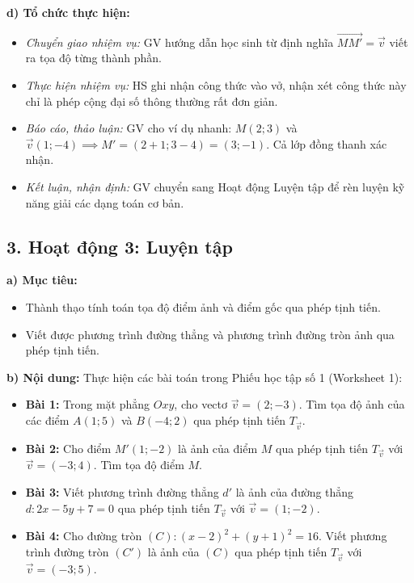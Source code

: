\documentclass[12pt, a4paper]{article}
\renewcommand{\vec}[1]{\overrightarrow{#1}}
\begin{document}
\noindent \textbf{d) Tổ chức thực hiện:}  
\begin{itemize}[leftmargin=0.8cm]  
    \item \textit{Chuyển giao nhiệm vụ:} GV hướng dẫn học sinh từ định nghĩa $\vec{MM'} = \vec{v}$ viết ra tọa độ từng thành phần.  
    \item \textit{Thực hiện nhiệm vụ:} HS ghi nhận công thức vào vở, nhận xét công thức này chỉ là phép cộng đại số thông thường rất đơn giản.  
    \item \textit{Báo cáo, thảo luận:} GV cho ví dụ nhanh: $M(2; 3)$ và $\vec{v}(1; -4) \implies M' = (2+1; 3-4) = (3; -1)$. Cả lớp đồng thanh xác nhận.  
    \item \textit{Kết luận, nhận định:} GV chuyển sang Hoạt động Luyện tập để rèn luyện kỹ năng giải các dạng toán cơ bản.  
\end{itemize}  
  
\subsection*{3. Hoạt động 3: Luyện tập}  
  
\noindent \textbf{a) Mục tiêu:}  
\begin{itemize}[leftmargin=0.8cm]  
    \item Thành thạo tính toán tọa độ điểm ảnh và điểm gốc qua phép tịnh tiến.  
    \item Viết được phương trình đường thẳng và phương trình đường tròn ảnh qua phép tịnh tiến.  
\end{itemize}  
  
\noindent \textbf{b) Nội dung:}  
Thực hiện các bài toán trong Phiếu học tập số 1 (Worksheet 1):  
\begin{itemize}[leftmargin=0.6cm]  
    \item \textbf{Bài 1:} Trong mặt phẳng $Oxy$, cho vectơ $\vec{v} = (2; -3)$. Tìm tọa độ ảnh của các điểm $A(1; 5)$ và $B(-4; 2)$ qua phép tịnh tiến $T_{\vec{v}}$.  
    \item \textbf{Bài 2:} Cho điểm $M'(1; -2)$ là ảnh của điểm $M$ qua phép tịnh tiến $T_{\vec{v}}$ với $\vec{v} = (-3; 4)$. Tìm tọa độ điểm $M$.  
    \item \textbf{Bài 3:} Viết phương trình đường thẳng $d'$ là ảnh của đường thẳng $d: 2x - 5y + 7 = 0$ qua phép tịnh tiến $T_{\vec{v}}$ với $\vec{v} = (1; -2)$.  
    \item \textbf{Bài 4:} Cho đường tròn $(C): (x - 2)^2 + (y + 1)^2 = 16$. Viết phương trình đường tròn $(C')$ là ảnh của $(C)$ qua phép tịnh tiến $T_{\vec{v}}$ với $\vec{v} = (-3; 5)$.  
\end{itemize}  
  
\end{document}
